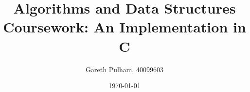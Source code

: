 \documentclass[a4paper]{article}
\begin{document}
    \begin{titlepage}
        \title{Algorithms and Data Structures Coursework: An Implementation in C}
        \author{Gareth Pulham, 40099603}
        \date{\today}
        \maketitle
        \thispagestyle{empty}
    \end{titlepage}
\end{document}
